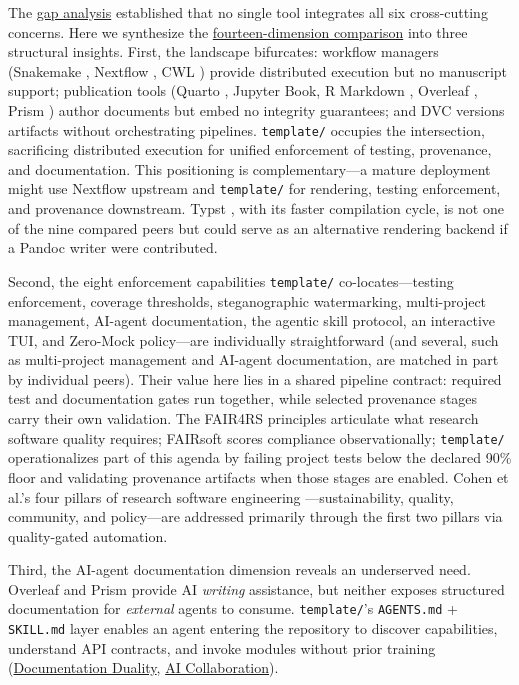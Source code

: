 \documentclass[
  english,
]{article}
\begin{document}
The \href{02_introduction.md\#the-gap}{gap analysis} established that no
single tool integrates all six cross-cutting concerns. Here we
synthesize the
\href{08f_appendix_matrix.md\#appendix-matrix}{fourteen-dimension
comparison} into three structural insights. First, the landscape
bifurcates: workflow managers (Snakemake \citep{koster2012snakemake},
Nextflow \citep{ditommaso2017nextflow}, CWL \citep{amstutz2016cwl})
provide distributed execution but no manuscript support; publication
tools (Quarto \citep{allaire2024quarto}, Jupyter Book, R Markdown
\citep{xie2018dynamic}, Overleaf \citep{overleaf2025}, Prism
\citep{openai2026prism}) author documents but embed no integrity
guarantees; and DVC \citep{iterative2024dvc} versions artifacts without
orchestrating pipelines. \texttt{template/} occupies the intersection,
sacrificing distributed execution for unified enforcement of testing,
provenance, and documentation. This positioning is complementary---a
mature deployment might use Nextflow upstream and \texttt{template/} for
rendering, testing enforcement, and provenance downstream. Typst
\citep{madje2023typst}, with its faster compilation cycle, is not one of
the nine compared peers but could serve as an alternative rendering
backend if a Pandoc writer were contributed.

Second, the eight enforcement capabilities \texttt{template/}
co-locates---testing enforcement, coverage thresholds, steganographic
watermarking, multi-project management, AI-agent documentation, the
agentic skill protocol, an interactive TUI, and Zero-Mock policy---are
individually straightforward (and several, such as multi-project
management and AI-agent documentation, are matched in part by individual
peers). Their value here lies in a shared pipeline contract: required
test and documentation gates run together, while selected provenance
stages carry their own validation. The FAIR4RS principles
\citep{barker2022fair4rs, lamprecht2020towards} articulate what research
software quality requires; FAIRsoft \citep{garijo2024fairsoft} scores
compliance observationally; \texttt{template/} operationalizes part of
this agenda by failing project tests below the declared 90\% floor and
validating provenance artifacts when those stages are enabled. Cohen et
al.'s four pillars of research software engineering
\citep{cohen2021four}---sustainability, quality, community, and
policy---are addressed primarily through the first two pillars via
quality-gated automation.

Third, the AI-agent documentation dimension reveals an underserved need.
Overleaf and Prism provide AI \emph{writing} assistance, but neither
exposes structured documentation for \emph{external} agents to consume.
\texttt{template/}'s \texttt{AGENTS.md} + \texttt{SKILL.md} layer
enables an agent entering the repository to discover capabilities,
understand API contracts, and invoke modules without prior training
(\href{03c_documentation.md\#documentation-duality-and-ai-collaboration}{Documentation
Duality}, \href{05d_ai_collaboration.md\#the-ai-collaboration-model}{AI
Collaboration}).
\end{document}
